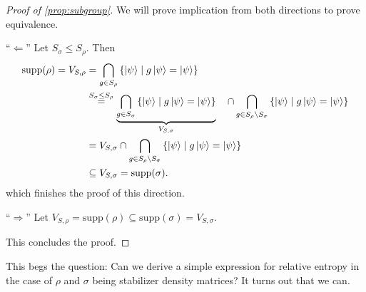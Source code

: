 \begin{proof}[Proof of \cref{prop:subgroup}]
  We will prove implication from both directions to prove equivalence.

  \enquote{$\Leftarrow$} Let $S_\sigma \leq S_\rho$. Then
  \begin{align*}
    \mathrm{supp}(\rho) = V_{S,\rho} &= \bigcap_{g\in S_\rho} \left\{ \ket{\psi} \mid
    g\ket{\psi} = \ket{\psi} \right\} \\
        &\overset{S_\sigma \leq S_\rho}{=} \underbrace{\bigcap_{g\in S_\sigma}
        \left\{\ket{\psi} \mid g \ket{\psi} =
        \ket{\psi}\right\}}_{V_{S,\sigma}}\ \ \ \cap \bigcap_{g \in S_\rho \setminus
        S_\sigma} \left\{\ket{\psi} \mid g \ket{\psi} =
        \ket{\psi}\right\}\\
        &= V_{S,\sigma} \cap \bigcap_{g \in S_\rho \setminus
        S_\sigma} \left\{\ket{\psi} \mid g \ket{\psi} =
        \ket{\psi}\right\}\\
        &\subseteq V_{S,\sigma} = \mathrm{supp}(\sigma)
  .\end{align*}
  which finishes the proof of this direction.

  \enquote{$\Rightarrow$} Let $V_{S,\rho} = \mathrm{supp}(\rho) \subseteq
  \mathrm{supp}(\sigma) = V_{S,\sigma}$. 


  This concludes the proof.
\end{proof}
This begs the question: Can we derive a simple expression for relative entropy
in the case of $\rho$ and $\sigma$ being stabilizer density matrices?
It turns out that we can.

